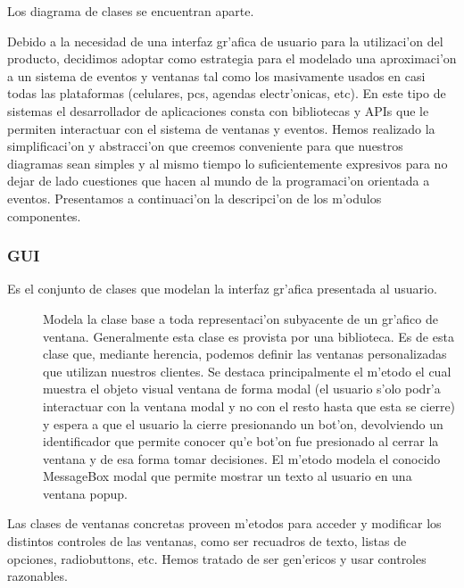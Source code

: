 Los diagrama de clases se encuentran aparte.

Debido a la necesidad de una interfaz gr'afica de usuario para la utilizaci'on del producto, decidimos adoptar como estrategia para el modelado una aproximaci'on a un sistema de eventos y ventanas tal como los masivamente usados en casi todas las plataformas (celulares, pcs, agendas electr'onicas, etc). En este tipo de sistemas el desarrollador de aplicaciones consta con bibliotecas y APIs que le permiten interactuar con el sistema de ventanas y eventos. Hemos realizado la simplificaci'on y abstracci'on que creemos conveniente para que nuestros diagramas sean simples y al mismo tiempo lo suficientemente expresivos para no dejar de lado cuestiones que hacen al mundo de la programaci'on orientada a eventos.
Presentamos a continuaci'on la descripci'on de los m'odulos componentes.
\clearpage

\subsubsection{GUI}
Es el conjunto de clases que modelan la interfaz gr'afica presentada al usuario.


\begin{description}
\item[] Modela la clase base a toda representaci'on subyacente de un gr'afico de ventana. Generalmente esta clase es provista por una biblioteca. Es de esta clase que, mediante herencia, podemos definir las ventanas personalizadas que utilizan nuestros clientes. Se destaca principalmente el m'etodo  el cual muestra el objeto visual ventana de forma modal (el usuario s'olo podr'a interactuar con la ventana modal y no con el resto hasta que esta se cierre) y espera a que el usuario la cierre presionando un bot'on, devolviendo un identificador que permite conocer qu'e bot'on fue presionado al cerrar la ventana y de esa forma tomar decisiones. El m'etodo  modela el conocido MessageBox modal que permite mostrar un texto al usuario en una ventana popup.
\end{description}

Las clases de ventanas concretas proveen m'etodos para acceder y modificar los distintos controles de las ventanas, como ser recuadros de texto, listas de opciones, radiobuttons, etc. Hemos tratado de ser gen'ericos y usar controles razonables.

